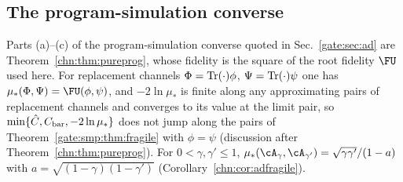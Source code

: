 \subsection*{The program-simulation converse}
Parts (a)--(c) of the program-simulation converse quoted in Sec.~\ref{gate:sec:ad} are Theorem~\ref{chn:thm:pureprog}, whose fidelity is the square of the root fidelity $\FU$ used here. For replacement channels $\Phi=\operatorname{Tr}(\cdot)\phi$, $\Psi=\operatorname{Tr}(\cdot)\psi$ one has $\mu_*(\Phi,\Psi)=\FU(\phi,\psi)$, and $-2\ln\mu_*$ is finite along any approximating pairs of replacement channels and converges to its value at the limit pair, so $\min\{\hat C,C_{\rm bar},-2\ln\mu_*\}$ does not jump along the pairs of Theorem~\ref{gate:smp:thm:fragile} with $\phi=\psi$ (discussion after Theorem~\ref{chn:thm:pureprog}). For $0<\gamma,\gamma'\le1$, $\mu_*(\cA_\gamma,\cA_{\gamma'})=\sqrt{\gamma\gamma'}/(1-a)$ with $a=\sqrt{(1-\gamma)(1-\gamma')}$ (Corollary~\ref{chn:cor:adfragile}).


\endgroup
